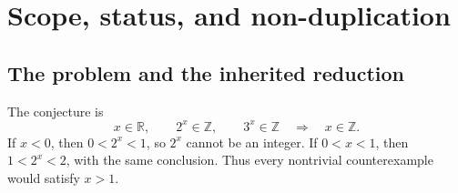 \documentclass[11pt,oneside]{article}
\theoremstyle{definition}
\theoremstyle{remark}
\newcommand{\R}{\mathbb{R}}
\newcommand{\Z}{\mathbb{Z}}
\begin{document}
\begin{abstract}
The report also proves that the Sturmian generating function has the unit circle as a natural boundary, formulates a Fourier-information criterion for forcing determinant parity/residue separation, and audits recent literature through August 21, 2026, including arXiv work on entropic sum-product inequalities, additive relations in irrational powers, refined Diophantine exponents, Gaussian Cobham theorems, and multiplicative dependence in sumsets.  No unconditional proof of the conjecture is claimed.  The outcome is a sharper map of what Shannon entropy can and cannot see, together with several concrete completion criteria whose verification would finish the problem.
\end{abstract}

\tableofcontents
\newpage

\section{Scope, status, and non-duplication}

\subsection{The problem and the inherited reduction}

The conjecture is
\begin{equation}\label{eq:AE}
  x\in\R,\qquad 2^x\in\Z,\qquad 3^x\in\Z
  \quad\Longrightarrow\quad x\in\Z.
\end{equation}
If $x<0$, then $0<2^x<1$, so $2^x$ cannot be an integer.  If $0<x<1$, then $1<2^x<2$, with the same conclusion.  Thus every nontrivial counterexample would satisfy $x>1$.
\end{document}
